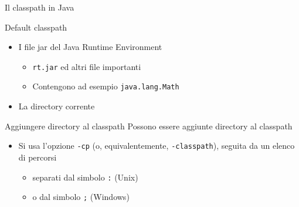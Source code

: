 \documentclass[xcolor=dvipsnames,presentation]{beamer}
\begin{document}
\begin{frame}[allowframebreaks]{Il classpath in Java}
\begin{block}{Default classpath}
        \begin{itemize}
            \item I file jar del Java Runtime Environment
            \begin{itemize}
                \item \texttt{rt.jar} ed altri file importanti
                \item Contengono ad esempio \texttt{java.lang.Math}
            \end{itemize}
            \item La directory corrente
        \end{itemize}
    \end{block}
    \begin{block}{Aggiungere directory al classpath}
        Possono essere aggiunte directory al classpath
        \begin{itemize}
            \item Si usa l'opzione \texttt{-cp} (o, equivalentemente, \texttt{-classpath}), seguita da un elenco di percorsi
            \begin{itemize}
                \item separati dal simbolo \texttt{:} (Unix)
                \item o dal simbolo \texttt{;} (Windows)
            \end{itemize}
        \end{itemize}
    \end{block}
\end{frame}
\end{document}
